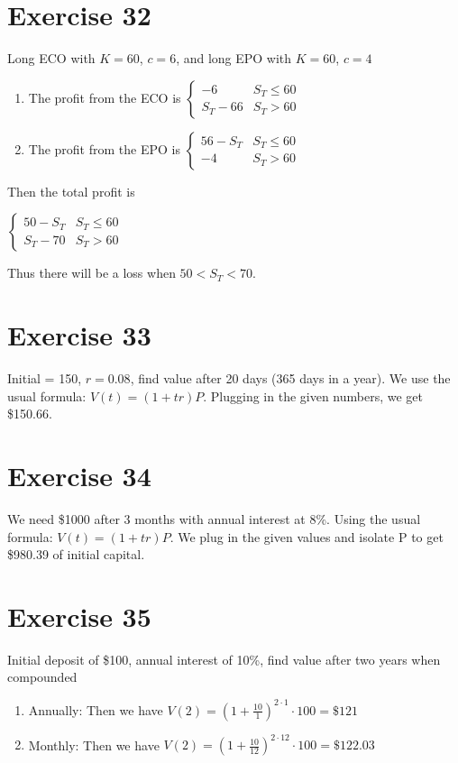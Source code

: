 \documentclass{article}
\begin{document}
\section*{Exercise 32}
Long ECO with $K= 60$, $c=6$, and long EPO with $K = 60$, $c = 4$
\begin{enumerate}
    \item The profit from the ECO is 
        $\begin{cases}
            -6 & S_T \leq 60 \\
            S_T - 66 & S_T > 60
        \end{cases}$
    \item The profit from the EPO is
        $\begin{cases}
            56 - S_T & S_T \leq 60 \\
            -4 & S_T > 60
        \end{cases}$
\end{enumerate}
Then the total profit is
\begin{center}
    $\begin{cases}
        50 - S_T & S_T \leq 60 \\
        S_T - 70 & S_T > 60
    \end{cases}$
\end{center}
Thus there will be a loss when $50 < S_T < 70$.

\section*{Exercise 33}
Initial = 150, $r = 0.08$, find value after 20 days (365 days in a year). We use the usual formula:
$V(t) = (1 + tr)P$. Plugging in the given numbers, we get \$150.66.

\section*{Exercise 34}
We need \$1000 after 3 months with annual interest at 8\%. Using the usual formula:
$V(t) = (1 + tr)P$. We plug in the given values and isolate P to get \$980.39 of initial capital.

\section*{Exercise 35}
Initial deposit of \$100, annual interest of 10\%, find value after two years when compounded
\begin{enumerate}
    \item Annually: Then we have $V(2) = (1 + \frac{10}{1})^{2\cdot1} \cdot 100 = \$121$
    \item Monthly: Then we have $V(2) = (1 + \frac{10}{12})^{2\cdot12} \cdot 100 = \$122.03$
\end{enumerate}
\end{document}
